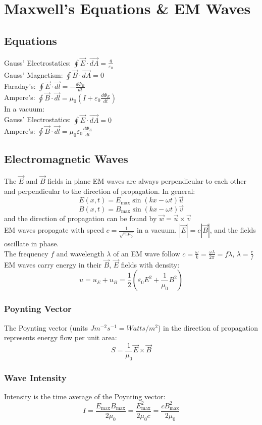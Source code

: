 \section{Maxwell's Equations \& EM Waves}
\subsection{Equations}
Gauss' Electrostatics: $\oint\vec{E}\cdot\vec{dA}=\frac{q}{\varepsilon_0}$\\
Gauss' Magnetism: $\oint\vec{B}\cdot\vec{dA}=0$\\
Faraday's: $\oint\vec{E}\cdot\vec{dl}=-\frac{d\Phi_B}{dt}$\\
Ampere's: $\oint\vec{B}\cdot\vec{dl}=\mu_0(I+\varepsilon_0\frac{d\Phi_E}{dt})$\\
In a vacuum:\\
Gauss' Electrostatics: $\oint\vec{E}\cdot\vec{dA}=0$\\
Ampere's: $\oint\vec{B}\cdot\vec{dl}=\mu_0\varepsilon_0\frac{d\Phi_E}{dt}$
\subsection{Electromagnetic Waves}
The $\vec{E}$ and $\vec{B}$ fields in plane EM waves are always perpendicular to each other and perpendicular to the direction of propagation. In general:
$$E(x,t)=E_{\text{max}}\sin{(kx-\omega t)}\vec{u}$$
$$B(x,t)=B_{\text{max}}\sin{(kx-\omega t)}\vec{v}$$
and the direction of propagation can be found by $\vec{w}=\vec{u}\times\vec{v}$\\
EM waves propagate with speed $c=\frac{1}{\sqrt{\varepsilon_0\mu_0}}$ in a vacuum. $|\vec{E}|=c|\vec{B}|$, and the fields oscillate in phase. \\
The frequency $f$ and wavelength $\lambda$ of an EM wave follow $c=\frac{\omega}{k}=\frac{\omega\lambda}{2\pi}=f\lambda$, $\lambda=\frac{c}{f}$\\
EM waves carry energy in their $\vec{B}$, $\vec{E}$ fields with density:
$$u=u_E+u_B=\frac{1}{2}(\varepsilon_0E^2+\frac{1}{\mu_0}B^2)$$
\subsubsection{Poynting Vector}
The Poynting vector (units $Jm^{-2}s^{-1}=Watts/m^2$) in the direction of propagation represents energy flow per unit area:
$$S=\frac{1}{\mu_0}\vec{E}\times\vec{B}$$
\subsubsection{Wave Intensity}
Intensity is the time average of the Poynting vector:
$$I=\frac{E_{\text{max}}B_{\text{max}}}{2\mu_0}=\frac{E_{\text{max}}^2}{2\mu_0c}=\frac{cB_{\text{max}}^2}{2\mu_0}$$
